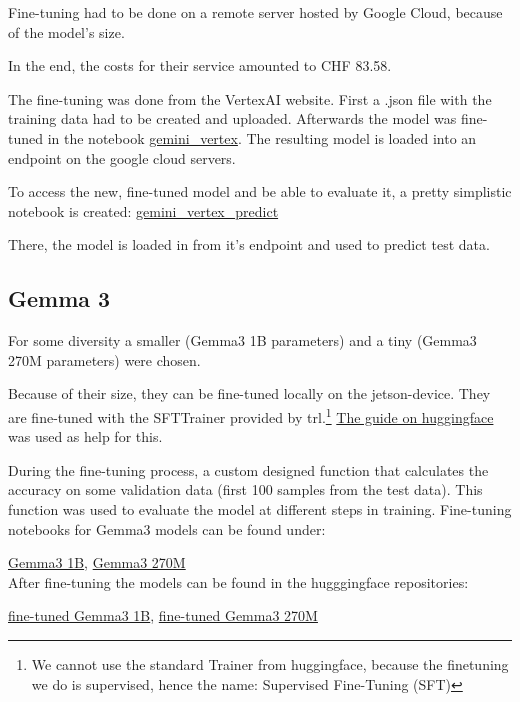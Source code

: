 \documentclass{article}
\begin{document}
Fine-tuning had to be done on a remote server hosted by Google Cloud, 
because of the model's size. 

In the end, the costs for their service amounted to CHF 83.58.

The fine-tuning was done from the VertexAI website. First a .json file with 
the training data had to be created and uploaded. Afterwards the model was 
fine-tuned in the notebook \href{https://github.com/AntonStantan/matura/blob/main/pre-trained-tranformers/gemini_vertex.ipynb}
{gemini\_vertex}. The resulting model is loaded into an endpoint on the 
google cloud servers.

To access the new, fine-tuned model and be able to evaluate it, a pretty 
simplistic notebook is created: \href{https://github.com/AntonStantan/matura/blob/main/pre-trained-tranformers/gemini_vertex_predict.ipynb}
{gemini\_vertex\_predict}

There, the model is loaded in from it's endpoint and used to predict test 
data. 

\subsection{Gemma 3}
For some diversity a smaller (Gemma3 1B parameters) and a tiny (Gemma3 270M 
parameters) were chosen.

Because of their size, they can be fine-tuned locally on the jetson-device.
They are fine-tuned with the SFTTrainer provided by trl.\footnote{We cannot 
use the standard Trainer from huggingface, because the finetuning we do is 
supervised, hence the name: Supervised Fine-Tuning (SFT)} \href{https://huggingface.co/docs/trl/en/sft_trainer}
{The guide on huggingface} was used as help for this.

During the fine-tuning process, a custom designed function that calculates 
the accuracy on some validation data (first 100 samples from the test data). 
This function was used to evaluate the model at different steps in training. 
Fine-tuning notebooks for Gemma3 models can be found under:

\href{https://github.com/AntonStantan/matura/blob/main/pre-trained-tranformers/big_gemma_huggingface.ipynb}{Gemma3 1B}, \href{https://github.com/AntonStantan/matura/blob/main/pre-trained-tranformers/gemma_huggingface.ipynb}{Gemma3 270M}
\\[2em]
After fine-tuning the models can be found in the hugggingface repositories:

\href{https://huggingface.co/AntonBOOM/big_output}{fine-tuned Gemma3 1B}, 
\href{https://huggingface.co/AntonBOOM/output1}{fine-tuned Gemma3 270M}
\end{document}
